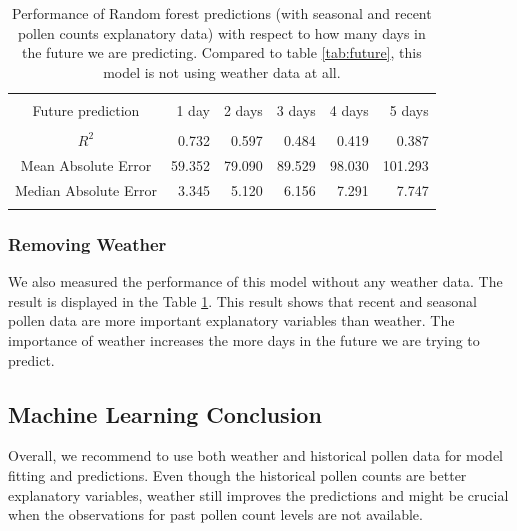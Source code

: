 \documentclass[a4paper,11pt]{article}
\begin{document}
\begin{table}
	\centering
	\begin{tabular}{crrrrr}
		\hline \\
		\vspace{0.6em}
		Future prediction & 1 day & 2 days & 3 days  & 4 days & 5 days  \\
		\hline \\
		\vspace{0.2em}
		$R^2$ & 0.732 & 0.597 & 0.484  & 0.419 & 0.387 \\ 
		\vspace{0.2em}
		Mean Absolute Error & 59.352 & 79.090 & 89.529  & 98.030 & 101.293\\
		\vspace{0.2em}
		Median Absolute Error & 3.345  & 5.120 & 6.156  & 7.291& 7.747  \\ \vspace{-0.4em} \\
		\hline
	\end{tabular}
	\caption{Performance of Random forest predictions (with seasonal and recent pollen counts explanatory data) with respect to how many days in the future we are predicting.  Compared to table \ref{tab:future}, this model is not using weather data at all.}
	\label{tab:futurenoweather}
\end{table}


\subsubsection*{Removing Weather}

We also measured the performance of this model without any weather data. The result is displayed in the Table \ref{tab:futurenoweather}. This result shows that recent and seasonal pollen data are more important explanatory variables than weather. The importance of weather increases the more days in the future we are trying to predict. 

\subsection{Machine Learning Conclusion}

Overall, we recommend to use both weather and historical pollen data for model fitting and predictions. Even though the historical pollen counts are better explanatory variables, weather still improves the predictions and might be crucial when the observations for past pollen count levels are not available.
\end{document}
